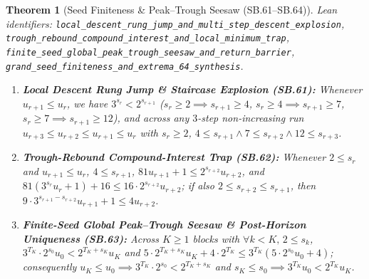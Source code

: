 \documentclass[11pt]{article}
\newtheorem{theorem}{Theorem}[section]
\begin{document}
\begin{theorem}[Seed Finiteness \& Peak--Trough Seesaw (SB.61--SB.64)]
\emph{Lean identifiers:} \nolinkurl{local_descent_rung_jump_and_multi_step_descent_explosion}, \nolinkurl{trough_rebound_compound_interest_and_local_minimum_trap}, \nolinkurl{finite_seed_global_peak_trough_seesaw_and_return_barrier}, \nolinkurl{grand_seed_finiteness_and_extrema_64_synthesis}.
\begin{enumerate}
  \item \textbf{Local Descent Rung Jump \& Staircase Explosion (SB.61):} Whenever $u_{r+1} \le u_r$, we have $3^{s_r} < 2^{s_{r+1}}$ ($s_r \ge 2 \implies s_{r+1} \ge 4$, $s_r \ge 4 \implies s_{r+1} \ge 7$, $s_r \ge 7 \implies s_{r+1} \ge 12$), and across any $3$-step non-increasing run $u_{r+3} \le u_{r+2} \le u_{r+1} \le u_r$ with $s_r \ge 2$, $4 \le s_{r+1} \wedge 7 \le s_{r+2} \wedge 12 \le s_{r+3}$.
  \item \textbf{Trough-Rebound Compound-Interest Trap (SB.62):} Whenever $2 \le s_r$ and $u_{r+1} \le u_r$, $4 \le s_{r+1}$, $81 u_{r+1} + 1 \le 2^{s_{r+2}} u_{r+2}$, and $81(3^{s_r} u_r + 1) + 16 \le 16 \cdot 2^{s_{r+2}} u_{r+2}$; if also $2 \le s_{r+2} \le s_{r+1}$, then $9 \cdot 3^{s_{r+1}-s_{r+2}} u_{r+1} + 1 \le 4 u_{r+2}$.
  \item \textbf{Finite-Seed Global Peak--Trough Seesaw \& Post-Horizon Uniqueness (SB.63):} Across $K \ge 1$ blocks with $\forall k < K,\, 2 \le s_k$, $3^{T_K} \cdot 2^{s_0} u_0 < 2^{T_K + s_K} u_K$ and $5 \cdot 2^{T_K + s_K} u_K + 4 \cdot 2^{T_K} \le 3^{T_K}(5 \cdot 2^{s_0} u_0 + 4)$; consequently $u_K \le u_0 \implies 3^{T_K} \cdot 2^{s_0} < 2^{T_K + s_K}$ and $s_K \le s_0 \implies 3^{T_K} u_0 < 2^{T_K} u_K$.
\end{enumerate}
\end{theorem}
\end{document}
